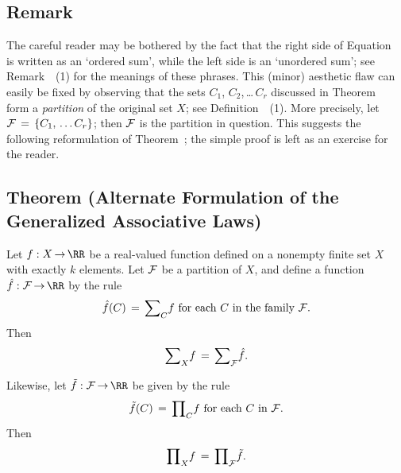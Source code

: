 {            \subsection{\small{\bf Remark}}
            \label{RemrkB10.80}

        The careful reader may be bothered by the fact that the right side of Equation~ is written as an `ordered sum', while the left side is an `unordered sum';
    see Remark~~(1) for the meanings of these  phrases.
    This (minor) aesthetic flaw can easily be fixed by observing that the sets $C_{1}$, $C_{2}$,\,{\ldots}\,$C_{r}$ discussed in Theorem~
    form a {\em partition} of the original set $X$; see Definition~~(1).
    More precisely, let ${\cal F} \,=\, \{C_{1},\,{\ldots}\,C_{r}\}$; then ${\cal F}$ is the partition in question.
    This suggests the following reformulation of Theorem~; the simple proof is left as an exercise for the reader.

\V

            \subsection{\small{\bf Theorem} (Alternate Formulation of the Generalized Associative Laws)}
            \label{ThmB10.90}

        Let $f:X \,{\rightarrow}\, {\RR}$ be a real-valued function defined on a nonempty finite set $X$ with exactly $k$ elements.
    Let ${\cal F}$ be a partition of $X$, and define a function $\hat{f}:{\cal F} \,{\rightarrow}\, {\RR}$ by the rule
        \begin{displaymath}
        \hat{f}(C) \,=\, {\sum}_{C} f \mbox{ for each $C$ in the family ${\cal F}$}.
        \end{displaymath}
    Then
        \begin{equation}
        \label{EqnB.30A}
        {\sum}_{X} f \,=\, {\sum}_{{\cal F}} \hat{f}.
        \end{equation}

        Likewise, let $\tilde{f}:{\cal F} \,{\rightarrow}\, {\RR}$ be given by the rule
        \begin{displaymath}
        \tilde{f}(C) \,=\, {\prod}_{C} f \mbox{ for each $C$ in ${\cal F}$}.
        \end{displaymath}
    Then
        \begin{equation}
        \label{EqnB.30B}
        {\prod}_{X} f \,=\, {\prod}_{{\cal F}} \tilde{f}.
        \end{equation}

}
